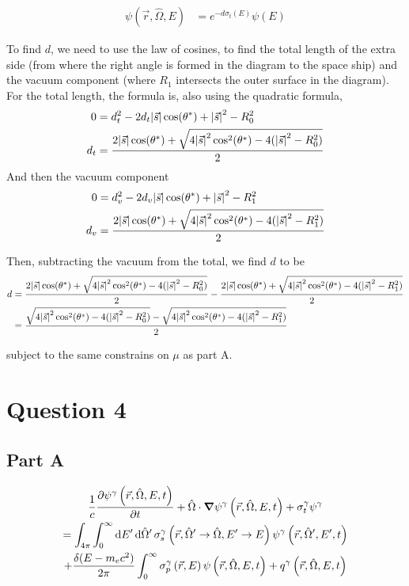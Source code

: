 \documentclass{article}
\begin{document}
\begin{align*}
  \psi(\vec{r},\hat{\Omega}, E) &= e^{-d\sigma_t(E)}\psi(E)
\end{align*}

To find $d$, we need to use the law of cosines, to find the total length of the extra side (from where the right angle is formed in the diagram to the space ship) and the vacuum component (where $R_1$ intersects the outer surface in the diagram). For the total length, the formula is, also using the quadratic formula,
\begin{align*}
  0 &= d_t^2 -2d_t\abs{\vec{s}}\cos(\theta^*) + \abs{\vec{s}}^2 - R_0^2\\
  d_t &= \frac{2\abs{\vec{s}}\cos(\theta^*) + \sqrt{4\abs{\vec{s}}^2\cos^2(\theta^*) - 4(\abs{\vec{s}}^2 - R_0^2)}}{2}
\end{align*}
And then the vacuum component
\begin{align*}
  0 &= d_v^2 -2d_v\abs{\vec{s}}\cos(\theta^*) + \abs{\vec{s}}^2 - R_1^2\\
  d_v &= \frac{2\abs{\vec{s}}\cos(\theta^*) + \sqrt{4\abs{\vec{s}}^2\cos^2(\theta^*) - 4(\abs{\vec{s}}^2 - R_1^2)}}{2}
\end{align*}

Then, subtracting the vacuum from the total, we find $d$ to be
\begin{align*}
  d &= \frac{2\abs{\vec{s}}\cos(\theta^*) + \sqrt{4\abs{\vec{s}}^2\cos^2(\theta^*) - 4(\abs{\vec{s}}^2 - R_0^2)}}{2} - \frac{2\abs{\vec{s}}\cos(\theta^*) + \sqrt{4\abs{\vec{s}}^2\cos^2(\theta^*) - 4(\abs{\vec{s}}^2 - R_1^2)}}{2} \\
  &= \frac{\sqrt{4\abs{\vec{s}}^2\cos^2(\theta^*) - 4(\abs{\vec{s}}^2 - R_0^2)} - \sqrt{4\abs{\vec{s}}^2\cos^2(\theta^*) - 4(\abs{\vec{s}}^2 - R_1^2)}}{2}
\end{align*}

subject to the same constrains on $\mu$ as part A. 

\clearpage
\newcommand{\psig}{\psi^{\gamma}}
\newcommand{\psin}{\psi^{n}}
\newcommand{\phase}{\left(\vec{r}, \hat{\Omega}, E, t\right)}
\newcommand{\renergy}{\left(\vec{r}, E\right)}
\newcommand{\double}{\left(\vec{r}, \hat{\Omega}' \rightarrow \hat{\Omega}, E'\rightarrow E\right)}
\newcommand{\psid}{\left(\vec{r}, \hat{\Omega}', E', t\right)}
\section{Question 4}
\subsection{Part A}
\begin{multline*}
  \frac{1}{c} \pdv{\psig\phase}{t}
  + \hat{\Omega}\cdot\grad\psig\phase
  + \sigma^{\gamma}_t\psig
  \\
  =
  \int_{4\pi}\int_0^{\infty}\dd{E'}\dd{\hat{\Omega}'}\sigma_s^{\gamma}\double \psig\psid
  \\+ \frac{\delta(E - m_ec^2)}{2\pi}\int_0^{\infty}\sigma_p^{\gamma}\renergy\psi\phase
  + q^{\gamma}\phase
\end{multline*}
\end{document}
